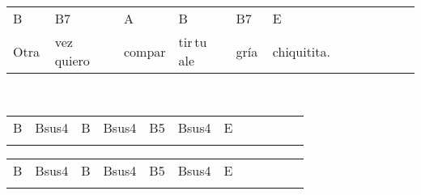 \begin{multicols}{2}
\chorus{}

\noindent
\begin{minipage}{\columnwidth}
\noindent
\noindent
\begin{tabular}{llllllllllll}
B&B7&A&B&B7&E\\
Otra\,&vez\,quiero\,&compar&tir\,tu\,ale&gría\,&chiquitita.
\end{tabular}
\end{minipage}\\

\noindent
\begin{minipage}{\columnwidth}
\noindent
\noindent
\begin{tabular}{llllllllllll}
B&Bsus4&B&Bsus4&B5&Bsus4&E\\
\quad\quad\quad\quad&\quad\quad\quad\quad&\quad\quad&\quad\quad\quad\quad&\quad\quad\quad&\quad\quad\quad\quad&
\end{tabular}

\noindent
\begin{tabular}{llllllllllll}
B&Bsus4&B&Bsus4&B5&Bsus4&E\\
\quad\quad\quad\quad&\quad\quad\quad\quad&\quad\quad&\quad\quad\quad\quad&\quad\quad\quad&\quad\quad\quad\quad&
\end{tabular}
\end{minipage}\\

\end{multicols}